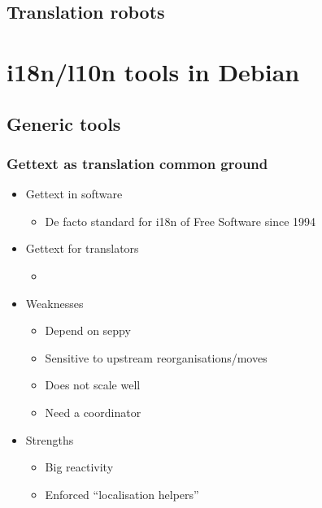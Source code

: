 \documentclass{beamer}
\begin{document}
\begin{frame}
  \frametitle{}
\end{frame}

\subsection{Translation robots}

\begin{frame}
  \frametitle{}
\end{frame}

\begin{frame}
  \frametitle{}
\end{frame}

\begin{frame}
  \frametitle{}
\end{frame}

\begin{frame}
  \frametitle{}
\end{frame}

\section{i18n/l10n tools in Debian}

\subsection{Generic tools}

\begin{frame}
  \frametitle{Gettext as translation common ground}
	\begin{itemize}
	\item
		Gettext in software
		\begin{itemize}
		\item
			De facto standard for i18n of Free Software since 1994
		\end{itemize}
	\item
		Gettext for translators
		\begin{itemize}
		\item
		\end{itemize}
	\item
		Weaknesses
		\begin{itemize}
		\item
			Depend on seppy
		\item
			Sensitive to upstream reorganisations/moves
		\item
			Does not scale well
		\item
			Need a coordinator
		\end{itemize}
	\item
		Strengths
		\begin{itemize}
		\item
			Big reactivity
		\item
			Enforced ``localisation helpers''
		\end{itemize}
	\end{itemize}
\end{frame}
\end{document}
